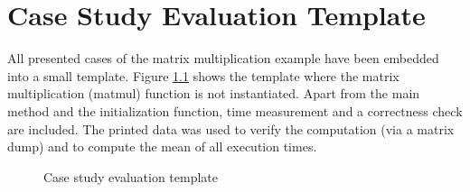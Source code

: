 
\chapter{Case Study Evaluation Template}
\label{AppendixA}

All presented cases of the matrix multiplication example
have been embedded into a small template.
Figure \ref{lst:MatmulVersionAFull} shows the template where the 
matrix multiplication (matmul) function is not instantiated. 
Apart from the main method and the initialization function,
time measurement and a correctness check are included.
The printed data was used to verify the computation (via a matrix dump) and 
to compute the mean of all execution times.

\resetlst
\begin{figure}[htpb]
  \centering
    \begin{minipage}[c]{\textwidth}
      
    \end{minipage}
   \caption{Case study evaluation template}
   \label{lst:MatmulVersionAFull}
\end{figure}
